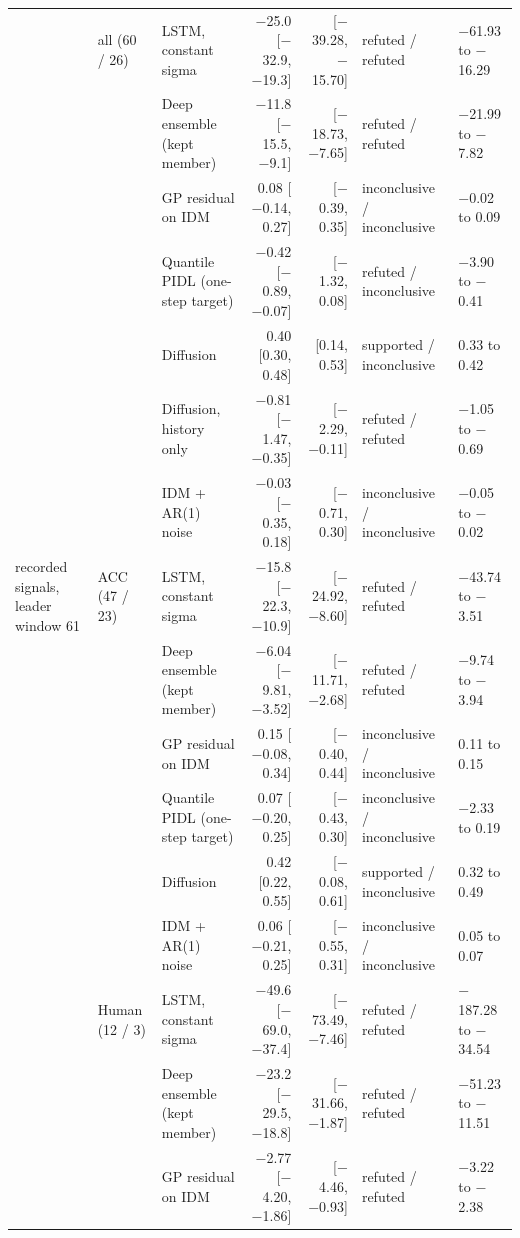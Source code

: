\begin{longtable}{lllrrll}
\midrule
 & all (60 / 26) & LSTM, constant sigma & $-$25.0 [$-$32.9, $-$19.3] & [$-$39.28, $-$15.70] & refuted / refuted & $-$61.93 to $-$16.29 \\
 &  & Deep ensemble (kept member) & $-$11.8 [$-$15.5, $-$9.1] & [$-$18.73, $-$7.65] & refuted / refuted & $-$21.99 to $-$7.82 \\
 &  & GP residual on IDM & 0.08 [$-$0.14, 0.27] & [$-$0.39, 0.35] & inconclusive / inconclusive & $-$0.02 to 0.09 \\
 &  & Quantile PIDL (one-step target) & $-$0.42 [$-$0.89, $-$0.07] & [$-$1.32, 0.08] & refuted / inconclusive & $-$3.90 to $-$0.41 \\
 &  & Diffusion & 0.40 [0.30, 0.48] & [0.14, 0.53] & supported / inconclusive & 0.33 to 0.42 \\
 &  & Diffusion, history only & $-$0.81 [$-$1.47, $-$0.35] & [$-$2.29, $-$0.11] & refuted / refuted & $-$1.05 to $-$0.69 \\
 &  & IDM + AR(1) noise & $-$0.03 [$-$0.35, 0.18] & [$-$0.71, 0.30] & inconclusive / inconclusive & $-$0.05 to $-$0.02 \\
\midrule
recorded signals, leader window 61 & ACC (47 / 23) & LSTM, constant sigma & $-$15.8 [$-$22.3, $-$10.9] & [$-$24.92, $-$8.60] & refuted / refuted & $-$43.74 to $-$3.51 \\
 &  & Deep ensemble (kept member) & $-$6.04 [$-$9.81, $-$3.52] & [$-$11.71, $-$2.68] & refuted / refuted & $-$9.74 to $-$3.94 \\
 &  & GP residual on IDM & 0.15 [$-$0.08, 0.34] & [$-$0.40, 0.44] & inconclusive / inconclusive & 0.11 to 0.15 \\
 &  & Quantile PIDL (one-step target) & 0.07 [$-$0.20, 0.25] & [$-$0.43, 0.30] & inconclusive / inconclusive & $-$2.33 to 0.19 \\
 &  & Diffusion & 0.42 [0.22, 0.55] & [$-$0.08, 0.61] & supported / inconclusive & 0.32 to 0.49 \\
 &  & IDM + AR(1) noise & 0.06 [$-$0.21, 0.25] & [$-$0.55, 0.31] & inconclusive / inconclusive & 0.05 to 0.07 \\
\midrule
 & Human (12 / 3) & LSTM, constant sigma & $-$49.6 [$-$69.0, $-$37.4] & [$-$73.49, $-$7.46] & refuted / refuted & $-$187.28 to $-$34.54 \\
 &  & Deep ensemble (kept member) & $-$23.2 [$-$29.5, $-$18.8] & [$-$31.66, $-$1.87] & refuted / refuted & $-$51.23 to $-$11.51 \\
 &  & GP residual on IDM & $-$2.77 [$-$4.20, $-$1.86] & [$-$4.46, $-$0.93] & refuted / refuted & $-$3.22 to $-$2.38 \\

\end{longtable}
